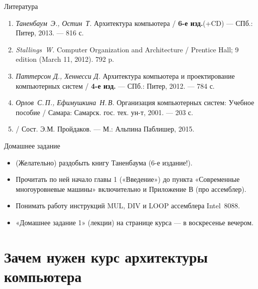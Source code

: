 \begin{frame}{Литература}
\begin{enumerate}
	\item \emph{Таненбаум~Э., Остин~Т.} Архитектура компьютера / \textbf{6-е изд.}(+CD) — СПб.: Питер, 2013. — 816 с.

	\item \emph{Stallings~W.} Computer Organization and Architecture /  Prentice Hall; 9 edition (March 11, 2012). 792 p.

    \item \emph{Паттерсон Д., Хеннесси Д.} Архитектура компьютера и проектирование компьютерных систем / \textbf{4-е изд.} — СПб.: Питер, 2012. — 784 с.

	\item \emph{Орлов~С.\,П., Ефимушкина~Н.\,В.}
	{Организация компьютерных систем}:
	Учебное пособие / Самара: Самарск. гос. тех. ун-т, 2001. — 203 с.

	\item {} / Сост. Э.М. Пройдаков. — М.:
	Альпина Паблишер, 2015.
\end{enumerate}
\end{frame}

\begin{frame}{Домашнее задание}
\begin{itemize}
	\item (Желательно) раздобыть книгу Таненбаума (6-е издание!).
	\item Прочитать по ней начало главы 1 («Введение») до пункта «Современные многоуровневые машины» включительно и Приложение В (про ассемблер).
	\item Понимать работу инструкций MUL, DIV и LOOP ассемблера Intel~8088.
	\item «Домашнее задание 1» (лекции) на странице курса — в воскресенье вечером.
\end{itemize}
\end{frame}

\section{Зачем нужен курс архитектуры компьютера}


